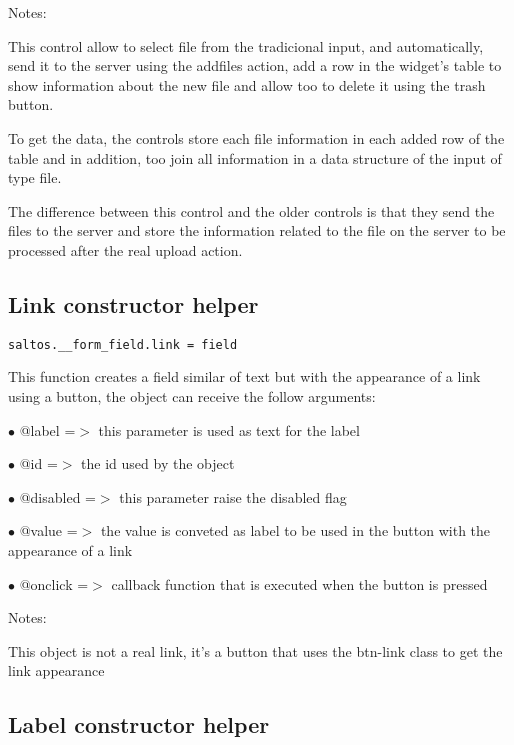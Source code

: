 \documentclass[a4paper]{book}
\begin{document}
Notes:

This control allow to select file from the tradicional input, and automatically, send it
to the server using the addfiles action, add a row in the widget's table to show information
about the new file and allow too to delete it using the trash button.

To get the data, the controls store each file information in each added row of the table and
in addition, too join all information in a data structure of the input of type file.

The difference between this control and the older controls is that they send the files to
the server and store the information related to the file on the server to be processed after
the real upload action.

\hypertarget{toc393}{}
\subsection{Link constructor helper}

\begin{lstlisting}
saltos.__form_field.link = field
\end{lstlisting}

This function creates a field similar of text but with the appearance of a link using a button,
the object can receive the follow arguments:

\begin{compactitem}
\item[\color{myblue}$\bullet$] @label    =$>$ this parameter is used as text for the label
\item[\color{myblue}$\bullet$] @id       =$>$ the id used by the object
\item[\color{myblue}$\bullet$] @disabled =$>$ this parameter raise the disabled flag
\item[\color{myblue}$\bullet$] @value    =$>$ the value is conveted as label to be used in the button with the appearance of a link
\item[\color{myblue}$\bullet$] @onclick  =$>$ callback function that is executed when the button is pressed
\end{compactitem}

Notes:

This object is not a real link, it's a button that uses the btn-link class to get the link
appearance

\hypertarget{toc394}{}
\subsection{Label constructor helper}
\end{document}
